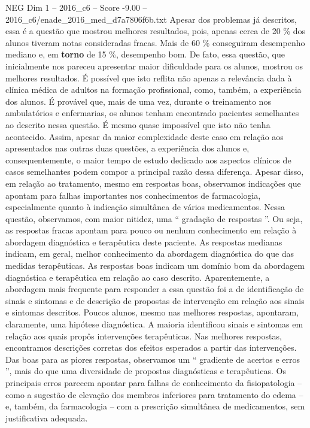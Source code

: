 \begin{textsample}{NEG Dim 1 – 2016\_c6 – Score -9.00 – 2016\_c6/enade\_2016\_med\_d7a7806f6b.txt}
Apesar dos problemas já descritos, essa é a questão que mostrou melhores resultados, pois, apenas cerca de 20 \% dos alunos tiveram notas consideradas fracas.
Mais de 60 \% conseguiram desempenho mediano e, em \textbf{torno} de 15 \%, desempenho bom.
De fato, essa questão, que inicialmente nos pareceu apresentar maior dificuldade para os alunos, mostrou os melhores resultados.
É possível que isto reflita não apenas a relevância dada à clínica médica de adultos na formação profissional, como, também, a experiência dos alunos.
É provável que, mais de uma vez, durante o treinamento nos ambulatórios e enfermarias, os alunos tenham encontrado pacientes semelhantes ao descrito nessa questão.
É mesmo quase impossível que isto não tenha acontecido.
Assim, apesar da maior complexidade deste caso em relação aos apresentados nas outras duas questões, a experiência dos alunos e, consequentemente, o maior tempo de estudo dedicado aos aspectos clínicos de casos semelhantes podem compor a principal razão dessa diferença.
Apesar disso, em relação ao tratamento, mesmo em respostas boas, observamos indicações que apontam para falhas importantes nos conhecimentos de farmacologia, especialmente quanto à indicação simultânea de vários medicamentos.
Nessa questão, observamos, com maior nitidez, uma “ gradação de respostas ”.
Ou seja, as respostas fracas apontam para pouco ou nenhum conhecimento em relação à abordagem diagnóstica e terapêutica deste paciente.
As respostas medianas indicam, em geral, melhor conhecimento da abordagem diagnóstica do que das medidas terapêuticas.
As respostas boas indicam um domínio bom da abordagem diagnóstica e terapêutica em relação ao caso descrito.
Aparentemente, a abordagem mais frequente para responder a essa questão foi a de identificação de sinais e sintomas e de descrição de propostas de intervenção em relação aos sinais e sintomas descritos.
Poucos alunos, mesmo nas melhores respostas, apontaram, claramente, uma hipótese diagnóstica.
A maioria identificou sinais e sintomas em relação aos quais propôs intervenções terapêuticas.
Nas melhores respostas, encontramos descrições corretas dos efeitos esperados a partir das intervenções.
Das boas para as piores respostas, observamos um “ gradiente de acertos e erros ”, mais do que uma diversidade de propostas diagnósticas e terapêuticas.
Os principais erros parecem apontar para falhas de conhecimento da fisiopatologia – como a sugestão de elevação dos membros inferiores para tratamento do edema – e, também, da farmacologia – com a prescrição simultânea de medicamentos, sem justificativa adequada.

\end{textsample}

